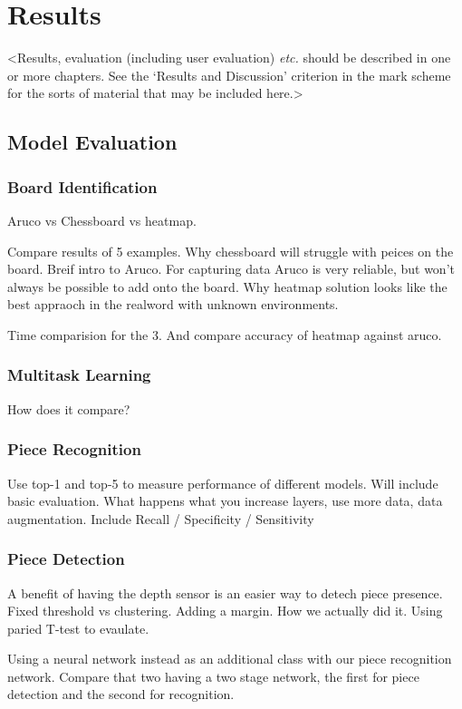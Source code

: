 \chapter{Results}
\label{results}

<Results, evaluation (including user evaluation) {\em etc.} should be described in one or more chapters. See the `Results and Discussion' criterion in the mark scheme for the sorts of material that may be included here.>

\section{Model Evaluation}

\subsection{Board Identification}
Aruco vs Chessboard vs heatmap. 

Compare results of 5 examples.  Why chessboard \cite{} will struggle with peices on the board.
Breif intro to Aruco.  For capturing data Aruco is very reliable, but won't always be possible to add onto the board.
Why heatmap solution looks like the best appraoch in the realword with unknown environments.  \cite{}

Time comparision for the 3.  And compare accuracy of heatmap against aruco.

\subsection{Multitask Learning}
How does it compare?

\subsection{Piece Recognition}
Use top-1 and top-5 to measure performance of different models.
Will include basic evaluation.  What happens what you increase layers, use more data, data augmentation.
Include Recall / Specificity / Sensitivity

\subsection{Piece Detection}
A benefit of having the depth sensor is an easier way to detech piece presence.  
Fixed threshold vs clustering.  Adding a margin.  How we actually did it.
Using paried T-test to evaulate.

Using a neural network instead as an additional class with our piece recognition network.
Compare that two having a two stage network, the first for piece detection and the second for recognition.

